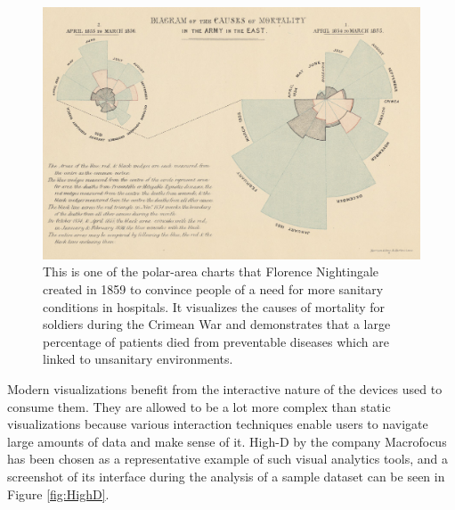 \begin{figure}[tp]
\centering
\includegraphics[keepaspectratio,width=\linewidth,height=\fullh / 3]{images/nightingale.png}
\caption[Polar-Area Chart by Florence Nightingale From 1859]{
  This is one of the polar-area charts that Florence Nightingale created in 1859 to convince people of a need for more sanitary conditions in hospitals.
  It visualizes the causes of mortality for soldiers during the Crimean War and demonstrates that a large percentage of patients died from preventable diseases which are linked to unsanitary environments.
}
\label{fig:NightingalePolarAreaChart}
\end{figure}

Modern visualizations benefit from the interactive nature of the devices used to consume them.
They are allowed to be a lot more complex than static visualizations because various interaction techniques enable users to navigate large amounts of data and make sense of it.
High-D by the company Macrofocus \parencite{HighD} has been chosen as a representative example of such visual analytics tools, and a screenshot of its interface during the analysis of a sample dataset can be seen in Figure \ref{fig:HighD}.

